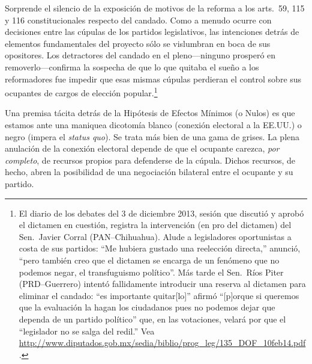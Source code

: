 \documentclass[letter,12pt]{article}
\begin{document}
Sorprende el silencio de la exposición de motivos de la reforma a los arts.\ 59, 115 y 116 constitucionales respecto del candado. Como a menudo ocurre con decisiones entre las cúpulas de los partidos legislativos, las intenciones detrás de elementos fundamentales del proyecto sólo se vislumbran en boca de sus opositores. Los detractores del candado en el pleno---ninguno prosperó en removerlo---confirma la sospecha de que lo que quitaba el sueño a los reformadores fue impedir que esas mismas cúpulas perdieran el control sobre sus ocupantes de cargos de elección popular.\footnote{El diario de los debates del 3 de diciembre 2013, sesión que discutió y aprobó el dictamen en cuestión, registra la intervención (en pro del dictamen) del Sen.\ Javier Corral (PAN--Chihuahua). Alude a legisladores oportunistas a costa de sus partidos: ``Me hubiera gustado una reelección directa,'' anunció, ``pero también creo que el dictamen se encarga de un fenómeno que no podemos negar, el transfuguismo político''. Más tarde el Sen.\ Ríos Piter (PRD--Guerrero) intentó fallidamente introducir una reserva al dictamen para eliminar el candado: ``es importante quitar[lo]'' afirmó ``[p]orque si queremos que la evaluación la hagan los ciudadanos pues no podemos dejar que dependa de un partido político'' que, en las votaciones, velará por que el ``legislador no se salga del redil.'' Vea \url{http://www.diputados.gob.mx/sedia/biblio/prog_leg/135_DOF_10feb14.pdf}.}



Una premisa tácita detrás de la Hipótesis de Efectos Mínimos (o Nulos) es que estamos ante una maniquea dicotomía blanco (conexión electoral a la EE.UU.) o negro (impera el \emph{status quo}). Se trata más bien de una gama de grises. La plena anulación de la conexión electoral depende de que el ocupante carezca, \emph{por completo}, de recursos propios para defenderse de la cúpula. Dichos recursos, de hecho, abren la posibilidad de una negociación bilateral entre el ocupante y su partido. 
\end{document}
